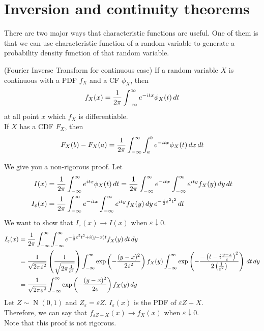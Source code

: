 \documentclass{huhtakm-template-book}
\DeclareMathOperator{\N}{N}
\begin{document}
\section{Inversion and continuity theorems}
There are two major ways that characteristic functions are useful. One of them is that we can use characteristic function of a random variable to generate a probability density function of that random variable.
\begin{thm}(Fourier Inverse Transform for continuous case)
    If a random variable $X$ is continuous with a PDF $f_{X}$ and a CF $\phi_{X}$, then
    \begin{equation*}
        f_{X}(x)=\frac{1}{2\pi}\int_{-\infty}^{\infty} e^{-itx}\phi_{X}(t)\,dt
    \end{equation*}
    at all point $x$ which $f_{X}$ is differentiable.\\
    If $X$ has a CDF $F_{X}$, then
    \begin{equation*}
        F_{X}(b)-F_{X}(a)=\frac{1}{2\pi}\int_{-\infty}^{\infty}\int_{a}^{b}e^{-itx}\phi_{X}(t)\,dx\,dt
    \end{equation*}
\end{thm}
\begin{proofing}
    We give you a non-rigorous proof. Let
    \begin{align*}
        I(x)&=\frac{1}{2\pi}\int_{-\infty}^{\infty} e^{itx}\phi_{X}(t)\,dt=\frac{1}{2\pi}\int_{-\infty}^{\infty} e^{-itx}\int_{-\infty}^{\infty} e^{ity}f_{X}(y)\,dy\,dt\\
        I_{\varepsilon}(x)&=\frac{1}{2\pi}\int_{-\infty}^{\infty} e^{-itx}\int_{-\infty}^{\infty} e^{ity}f_{X}(y)\,dy\,e^{-\frac{1}{2}\varepsilon^{2}t^{2}}\,dt
    \end{align*}
    We want to show that $I_{\varepsilon}(x)\to I(x)$ when $\varepsilon\downarrow 0$.
    \begin{align*}
        I_{\varepsilon}(x)&=\frac{1}{2\pi}\int_{-\infty}^{\infty}\int_{-\infty}^{\infty} e^{-\frac{1}{2}\varepsilon^{2}t^{2}+i(y-x)t}f_{X}(y)\,dt\,dy\\
        &=\frac{1}{\sqrt{2\pi\varepsilon^{2}}}\left(\frac{1}{\sqrt{2\pi\frac{1}{\varepsilon^{2}}}}\right)\int_{-\infty}^{\infty}\exp\left(-\frac{(y-x)^{2}}{2\varepsilon^{2}}\right)f_{X}(y)\int_{-\infty}^{\infty}\exp\left(-\frac{-\left(t-i\frac{y-x}{\varepsilon}\right)^{2}}{2\left(\frac{1}{\varepsilon^{2}}\right)}\right)\,dt\,dy\\
        &=\frac{1}{\sqrt{2\pi\varepsilon^{2}}}\int_{-\infty}^{\infty}\exp\left(-\frac{(y-x)^{2}}{2\epsilon}\right)f_{X}(y)\,dy
    \end{align*}
    Let $Z\sim\N(0,1)$ and $Z_{\varepsilon}=\varepsilon Z$. $I_{\varepsilon}(x)$ is the PDF of $\varepsilon Z+X$.\\
    Therefore, we can say that $f_{\varepsilon Z+X}(x)\to f_{X}(x)$ when $\varepsilon\downarrow 0$.\\
    Note that this proof is not rigorous.
\end{proofing}
\end{document}
